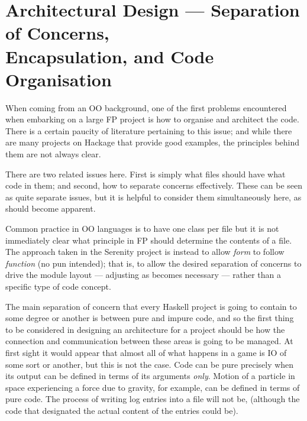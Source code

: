 \section[Architectural Design --- Separation of Concerns, Encapsulation, and Code Organisation]{Architectural Design --- Separation of Concerns, \\Encapsulation, and Code Organisation}


When coming from an OO background, one of the first problems encountered when embarking on a large FP project is how to organise and architect the code. There is a certain paucity of literature pertaining to this issue; and while there are many projects on Hackage that provide good examples, the principles behind them are not always clear.

There are two related issues here. First is simply what files should have what code in them; and second, how to separate concerns effectively. These can be seen as quite separate issues, but it is helpful to consider them simultaneously here, as should become apparent.

Common practice in OO languages is to have one class per file but it is not immediately clear what principle in FP should determine the contents of a file. The approach taken in the Serenity project is instead to allow \emph{form} to follow \emph{function} (no pun intended); that is, to allow the desired separation of concerns to drive the module layout --- adjusting as becomes necessary --- rather than a specific type of code concept.

The main separation of concern that every Haskell project is going to contain to some degree or another is between pure and impure code, and so the first thing to be considered in designing an architecture for a project should be how the connection and communication between these areas is going to be managed.
At first sight it would appear that almost all of what happens in a game is IO of some sort or another, but this is not the case. Code can be pure precisely when its output can be defined in terms of its arguments \emph{only}. Motion of a particle in space experiencing a force due to gravity, for example, can be defined in terms of pure code. The process of writing log entries into a file will not be, (although the code that designated the actual content of the entries could be).

